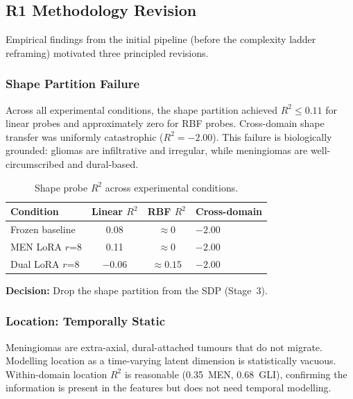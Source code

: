 \subsection{R1 Methodology Revision}
\label{sec:eval:revision}

Empirical findings from the initial pipeline (before the complexity ladder
reframing) motivated three principled revisions.

\subsubsection{Shape Partition Failure}

Across all experimental conditions, the shape partition achieved
$R^2 \leq 0.11$ for linear probes and approximately zero for RBF probes.
Cross-domain shape transfer was uniformly catastrophic ($R^2 = -2.00$).
This failure is biologically grounded: gliomas are infiltrative and
irregular, while meningiomas are well-circumscribed and dural-based.

\begin{table}[H]
  \centering
  \caption{Shape probe $R^2$ across experimental conditions.}
  \label{tab:shape_failure}
  \begin{tabular}{lccl}
    \toprule
    \textbf{Condition} & \textbf{Linear $R^2$} & \textbf{RBF $R^2$} &
      \textbf{Cross-domain} \\
    \midrule
    Frozen baseline   & 0.08  & $\approx 0$ & $-2.00$ \\
    MEN LoRA $r$=8    & 0.11  & $\approx 0$ & $-2.00$ \\
    Dual LoRA $r$=8   & $-0.06$ & $\approx 0.15$ & $-2.00$ \\
    \bottomrule
  \end{tabular}
\end{table}

\textbf{Decision:} Drop the shape partition from the SDP (Stage~3).

\subsubsection{Location: Temporally Static}

Meningiomas are extra-axial, dural-attached tumours that do not migrate.
Modelling location as a time-varying latent dimension is statistically
vacuous. Within-domain location $R^2$ is reasonable (0.35~MEN, 0.68~GLI),
confirming the information is present in the features but does not need
temporal modelling.

